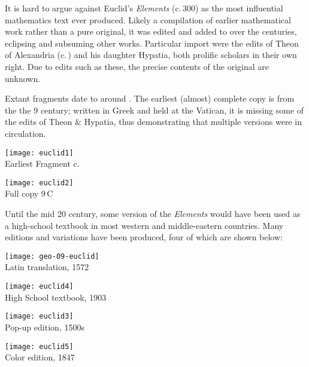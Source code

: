 It is hard to argue against Euclid's \emph{Elements} (c.\,300\BC{}) as the most influential mathematics text ever produced. Likely a compilation of earlier mathematical work rather than a pure original, it was edited and added to over the centuries, eclipsing and subsuming other works. Particular import were the edits of Theon of Alexandria (c.\,) and his daughter Hypatia, both prolific scholars in their own right. Due to edits such as these, the precise contents of the original are unknown.\smallbreak

Extant fragments date to around . The earliest (almost) complete copy is from the the 9\th{} century; written in Greek and held at the Vatican, it is missing some of the edits of Theon \& Hypatia, thus demonstrating that multiple versions were in circulation.

\begin{center}
	\begin{minipage}[b]{0.45\linewidth}
		\centering\texttt{[image: euclid1]}\\
		Earliest Fragment c.\,
	\end{minipage}
	\begin{minipage}[b]{0.45\linewidth}
		\centering\texttt{[image: euclid2]}\\
		Full copy 9\th\,C
	\end{minipage}
\end{center}

\goodbreak

Until the mid 20\th{} century, some version of the \emph{Elements} would have been used as a high-school textbook in most western and middle-eastern countries. Many editions and variations have been produced, four of which are shown below:
\begin{center}
	\begin{minipage}[b]{0.683\linewidth}\vspace{0pt}
		\centering
		\texttt{[image: geo-09-euclid]}\\
		Latin translation, 1572
	\end{minipage}%
	\begin{minipage}[b]{0.317\linewidth}\vspace{0pt}
		\centering\texttt{[image: euclid4]}\\
		High School textbook, 1903
	\end{minipage}%
	\smallbreak
	\begin{minipage}[b]{0.67\linewidth}\vspace{0pt}
		\centering\texttt{[image: euclid3]}\\
		Pop-up edition, 1500s
	\end{minipage}%
	\begin{minipage}[b]{0.33\linewidth}\vspace{0pt}
		\centering\texttt{[image: euclid5]}\\
		Color edition, 1847
	\end{minipage}
\end{center}

